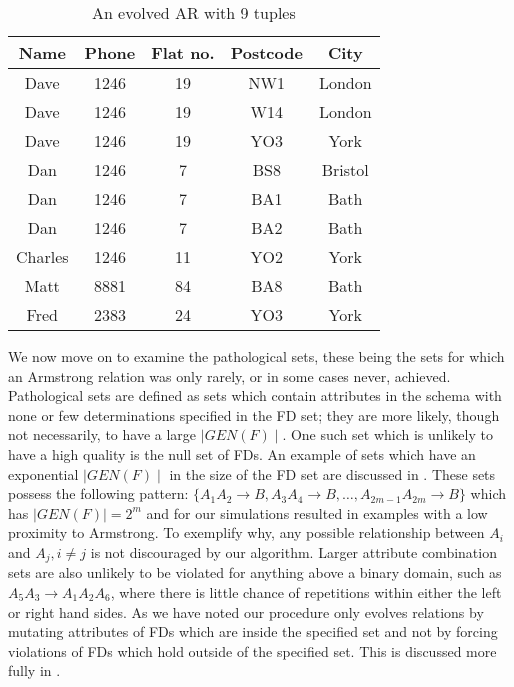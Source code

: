 {\line
\begin{table}
\begin{center}
\begin{tabular}{|c|c|c|c|c|} \hline 
{ \bf Name} & { \bf Phone} & {\bf Flat no. }  & { \bf Postcode}  & {\bf City} \\ \hline
Dave & 1246 & 19 & NW1 & London  \\
Dave & 1246 & 19 & W14 & London \\
Dave & 1246 & 19 & YO3 & York \\
Dan & 1246 & 7 & BS8 & Bristol \\
Dan & 1246 & 7 & BA1 & Bath \\
Dan & 1246 & 7 & BA2 & Bath \\
Charles & 1246 & 11 & YO2 & York \\
Matt & 8881 & 84 & BA8 & Bath \\
Fred & 2383 & 24 & YO3 & York \\ \hline
\end{tabular}
\end{center}
\caption{\label{table:5.34} An evolved AR with 9 tuples }
\end{table}
}

\medskip

We now move on to examine the pathological sets, these being
the sets for which an Armstrong relation was only rarely,
or in some cases never, achieved. Pathological sets are
defined as sets which contain attributes in the schema with none or
few
determinations specified in the FD set; they are more likely,
though not necessarily, to have a large $\mid GEN(F) \mid$. One
such set which is unlikely to have a high quality is the null
set of FDs. An example of sets which have an exponential $\mid GEN(F) \mid$
in the size of the FD set are discussed in \cite{bdfs84}.
These sets possess the following pattern: $\{ A_1A_2 \to B, A_3A_4 \to B, \ldots , A_{2m-1}A_{2m} \to B \}$ which has  $\mid GEN(F) \mid = 2^m$ and for
our simulations resulted in examples with a low proximity to Armstrong.
To exemplify why, any possible relationship between $A_i$ and $A_j, i
\not= j$ is not discouraged by our algorithm. Larger attribute combination sets are also
unlikely to be violated for anything above a binary domain, such as
$A_5A_3 \to A_1A_2A_6$, where there is little chance of repetitions
within either the left or right hand sides.
As we have noted
our procedure only evolves relations by mutating attributes of FDs which are
inside the specified set and not by forcing violations of FDs which
hold outside of the specified set. This is discussed more fully in \cite{cl96}.


